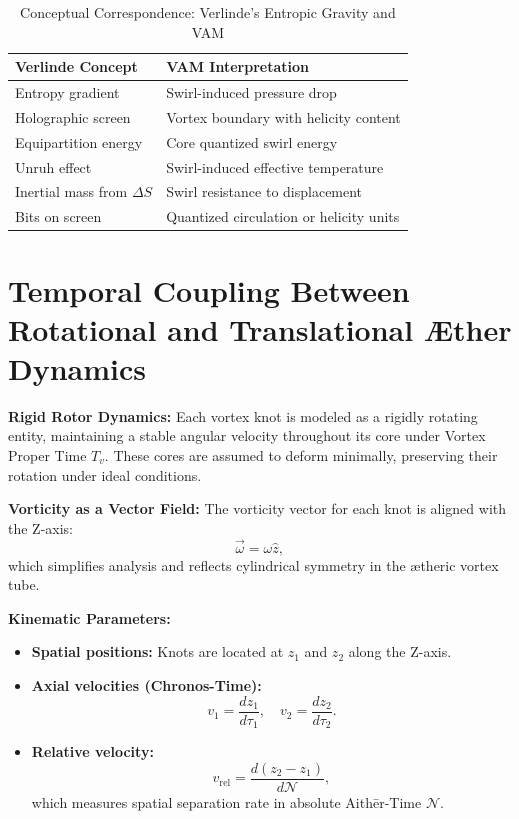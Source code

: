 \documentclass[12pt]{article}
\begin{document}
    \begin{table}[H]
        \centering
        \caption{Conceptual Correspondence: Verlinde's Entropic Gravity and VAM}
        \footnotesize
        \begin{tabular}{|l|l|}
            \hline
            \textbf{Verlinde Concept} & \textbf{VAM Interpretation} \\
            \hline
            Entropy gradient & Swirl-induced pressure drop \\
            Holographic screen & Vortex boundary with helicity content \\
            Equipartition energy & Core quantized swirl energy \\
            Unruh effect & Swirl-induced effective temperature \\
            Inertial mass from $\Delta S$ & Swirl resistance to displacement \\
            Bits on screen & Quantized circulation or helicity units \\
            \hline
        \end{tabular}
    \end{table}



    \section{Temporal Coupling Between Rotational and Translational Æther Dynamics}

    \textbf{Rigid Rotor Dynamics:} Each vortex knot is modeled as a rigidly rotating entity, maintaining a stable angular velocity throughout its core under Vortex Proper Time \( T_v \). These cores are assumed to deform minimally, preserving their rotation under ideal conditions.

    \textbf{Vorticity as a Vector Field:} The vorticity vector for each knot is aligned with the Z-axis:
    \begin{equation*}
        \vec{\omega} = \omega \hat{z},
    \end{equation*}
    which simplifies analysis and reflects cylindrical symmetry in the ætheric vortex tube.

    \textbf{Kinematic Parameters:}
    \begin{itemize}
        \item \textbf{Spatial positions:} Knots are located at \( z_1 \) and \( z_2 \) along the Z-axis.
        \item \textbf{Axial velocities (Chronos-Time):}
        \begin{equation*}
            v_1 = \frac{dz_1}{d\tau_1}, \quad v_2 = \frac{dz_2}{d\tau_2}.
        \end{equation*}
        \item \textbf{Relative velocity:}
        \begin{equation*}
            v_\text{rel} = \frac{d(z_2 - z_1)}{d\mathcal{N}},
        \end{equation*}
        which measures spatial separation rate in absolute Aithēr-Time \( \mathcal{N} \).
    \end{itemize}
\end{document}
